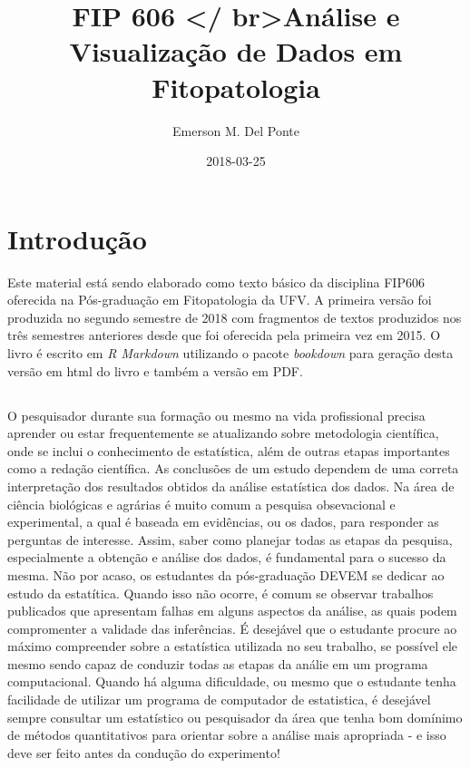 \documentclass[]{book}
\title{FIP 606 \textless{}/ br\textgreater{}Análise e Visualização de Dados em
Fitopatologia}
\author{Emerson M. Del Ponte}
\date{2018-03-25}
\begin{document}
\maketitle

{
\setcounter{tocdepth}{1}
\tableofcontents
}
\hypertarget{introducao}{%
\chapter{Introdução}\label{introducao}}

Este material está sendo elaborado como texto básico da disciplina
FIP606 oferecida na Pós-graduação em Fitopatologia da UFV. A primeira
versão foi produzida no segundo semestre de 2018 com fragmentos de
textos produzidos nos três semestres anteriores desde que foi oferecida
pela primeira vez em 2015. O livro é escrito em \emph{R Markdown}
utilizando o pacote \emph{bookdown} para geração desta versão em html do
livro e também a versão em PDF.

\hypertarget{section}{%
\section{}\label{section}}

O pesquisador durante sua formação ou mesmo na vida profissional precisa
aprender ou estar frequentemente se atualizando sobre metodologia
científica, onde se inclui o conhecimento de estatística, além de outras
etapas importantes como a redação científica. As conclusões de um estudo
dependem de uma correta interpretação dos resultados obtidos da análise
estatística dos dados. Na área de ciência biológicas e agrárias é muito
comum a pesquisa obsevacional e experimental, a qual é baseada em
evidências, ou os dados, para responder as perguntas de interesse.
Assim, saber como planejar todas as etapas da pesquisa, especialmente a
obtenção e análise dos dados, é fundamental para o sucesso da mesma. Não
por acaso, os estudantes da pós-graduação DEVEM se dedicar ao estudo da
estatítica. Quando isso não ocorre, é comum se observar trabalhos
publicados que apresentam falhas em alguns aspectos da análise, as quais
podem compromenter a validade das inferências. É desejável que o
estudante procure ao máximo compreender sobre a estatística utilizada no
seu trabalho, se possível ele mesmo sendo capaz de conduzir todas as
etapas da análie em um programa computacional. Quando há alguma
dificuldade, ou mesmo que o estudante tenha facilidade de utilizar um
programa de computador de estatistica, é desejável sempre consultar um
estatístico ou pesquisador da área que tenha bom domínimo de métodos
quantitativos para orientar sobre a análise mais apropriada - e isso
deve ser feito antes da condução do experimento!
\end{document}
